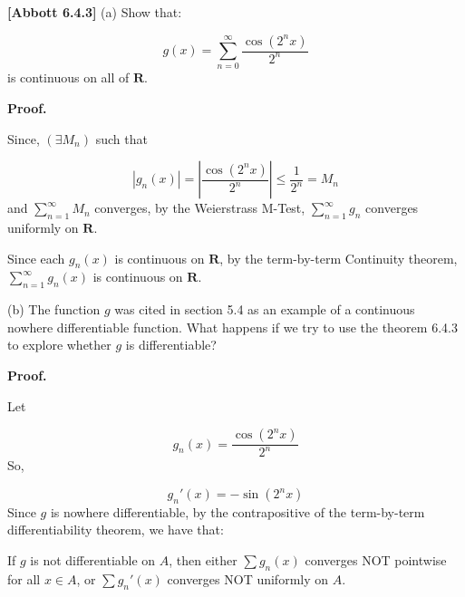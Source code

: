 \documentclass[10pt]{article}
\begin{document}
\textbf{[Abbott 6.4.3] }(a) Show that:


\begin{equation*}
g( x) =\sum _{n=0}^{\infty }\frac{\cos\left( 2^{n} x\right)}{2^{n}}
\end{equation*}
is continuous on all of $\displaystyle \mathbf{R}$.



\textbf{Proof.}



Since, $\displaystyle ( \exists M_{n})$ such that


\begin{equation*}
|g_{n}( x) |=\left| \frac{\cos\left( 2^{n} x\right)}{2^{n}}\right| \leq \frac{1}{2^{n}} =M_{n}
\end{equation*}
and $\displaystyle \sum _{n=1}^{\infty } M_{n}$ converges, by the Weierstrass M-Test, $\displaystyle \sum _{n=1}^{\infty } g_{n}$ converges uniformly on $\displaystyle \mathbf{R}$. 



Since each $\displaystyle g_{n}( x)$ is continuous on $\displaystyle \mathbf{R}$, by the term-by-term Continuity theorem, $\displaystyle \sum _{n=1}^{\infty } g_{n}( x)$ is continuous on $\displaystyle \mathbf{R}$.



(b) The function $\displaystyle g$ was cited in section 5.4 as an example of a continuous nowhere differentiable function. What happens if we try to use the theorem 6.4.3 to explore whether $\displaystyle g$ is differentiable?



\textbf{Proof.}



Let 


\begin{equation*}
g_{n}( x) =\frac{\cos\left( 2^{n} x\right)}{2^{n}}
\end{equation*}
So,


\begin{equation*}
g_{n} '( x) =-\sin\left( 2^{n} x\right)
\end{equation*}
Since $\displaystyle g$ is nowhere differentiable, by the contrapositive of the term-by-term differentiability theorem, we have that:



If $\displaystyle g$ is not differentiable on $\displaystyle A$, then either $\displaystyle \sum g_{n}( x)$ converges NOT pointwise for all $\displaystyle x\in A$, or $\displaystyle \sum g_{n} '( x)$ converges NOT uniformly on $\displaystyle A$. 
\end{document}
